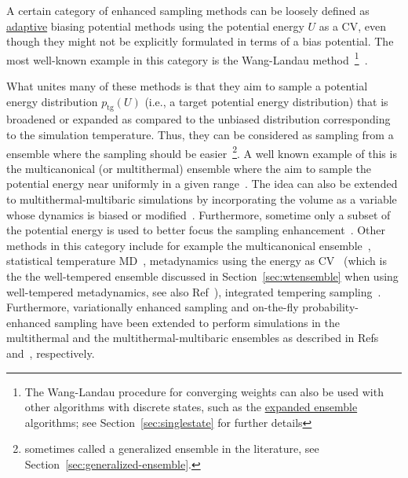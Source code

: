 \documentclass[9pt,review]{livecoms}
\begin{document}
A certain category of enhanced sampling methods can be loosely defined as \hyperlink{ref:Adaptive} {adaptive} biasing potential methods using the potential energy $U$ as a CV, even though they might not be explicitly formulated in terms of a bias potential. The most well-known example in this category is the Wang-Landau method~\footnote{The Wang-Landau procedure for converging weights can also be used with other algorithms with discrete states, such as the \hyperlink{ref:ExpEns} {expanded ensemble} algorithms; see Section~\ref{sec:singlestate} for further details}~\cite{wang-landau:prl:2001:wang-landau}. 

What unites many of these methods is that they aim to sample a potential energy distribution $p_{\mathrm{tg}}(U)$ (i.e., a target potential energy distribution) that is broadened or expanded as compared to the unbiased distribution corresponding to the simulation temperature. Thus, they can be considered as sampling from a ensemble where the sampling should be easier~\footnote{sometimes called a generalized ensemble in the literature, see Section~\ref{sec:generalized-ensemble}.}. A well known example of this is the multicanonical (or multithermal) ensemble where the aim to sample the potential energy near uniformly in a given range~\cite{Berg1992_Multicanonical}. The idea can also be extended to multithermal-multibaric simulations by incorporating the volume as a variable whose dynamics is biased or modified~\cite{Okumura_MultiTP_2004,Shell_MultiTP_2002}. Furthermore, sometime only a subset of the potential energy is used to better focus the sampling enhancement~\cite{Yang_SITS_2009}. Other methods in this category include for example
the multicanonical ensemble~\cite{Berg1992_Multicanonical},
statistical temperature MD~\cite{Kim2006_PRL_STMD},
metadynamics using the energy as CV~\cite{Micheletti_MetaE_Energy_2004,Bonomi-PRL-2010}
(which is the the well-tempered ensemble discussed in Section~\ref{sec:wtensemble} when using well-tempered metadynamics, see also Ref~\cite{Valsson-JCTC-2013}),
integrated tempering sampling~\cite{Gao_ITS_2008,Gao_ITS_Review_2015}.
Furthermore, variationally enhanced sampling and on-the-fly probability-enhanced sampling have been extended to perform simulations in the multithermal and the multithermal-multibaric ensembles as described in Refs~\citep{Piaggi_MultiVES_2019,Piaggi_MultiVES+CV_2019} and~\citep{invernizzi2020unified}, respectively.
\end{document}
